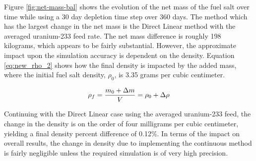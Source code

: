 Figure \ref{fig:net-mass-bal} shows the evolution of the net mass of the fuel salt over time while using a 30 day depletion time step over 360 days. The method which has the largest change in the net mass is the Direct Linear method with the averaged uranium-233 feed rate. The net mass difference is roughly 198 kilograms, which appears to be fairly substantial. However, the approximate impact upon the simulation accuracy is dependent on the density. Equation \eqref{eq:new_rho_2} shows how the final density is impacted by the added mass, where the initial fuel salt density, $\rho_0$, is 3.35 grams per cubic centimeter.

\begin{equation} \hfill
\rho_f = \frac{m_0 + \Delta m}{V} = \rho_0 + \Delta \rho
\hfill\label{eq:new_rho_2} \end{equation}

Continuing with the Direct Linear case using the averaged uranium-233 feed, the change in the density is on the order of four milligrams per cubic centimeter, yielding a final density percent difference of 0.12\%. In terms of the impact on overall results, the change in density due to implementing the continuous method is fairly negligible unless the required simulation is of very high precision.









